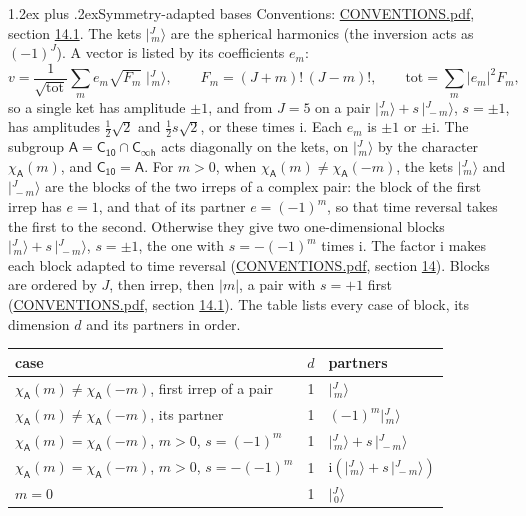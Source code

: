 \documentclass[10pt,a4paper]{article}
\makeatletter
\renewcommand\section{\@startsection{section}{1}{\z@}{-3ex plus -1ex minus -.2ex}%
  {1.2ex plus .2ex}{\normalfont\large\sffamily\bfseries\color{parttitle}}}
\numberwithin{equation}{section}
\newcommand{\grp}[1]{\mathsf{#1}}
\newcommand{\iunit}{\mathrm{i}}
\newcommand{\chiA}{\chi_{\grp{A}}}
\newcommand{\jm}[2]{\bigl\lvert{}^{#1}_{\,#2}\bigr\rangle}
\makeatother
\begin{document}
\section{Symmetry-adapted bases}\label{s:bases}
Conventions: \href{../../CONVENTIONS.pdf}{CONVENTIONS.pdf}, section \href{../../CONVENTIONS.pdf\#conv.14.1}{14.1}.
\leavevmode\label{n:index.m}\label{n:vector.ket}The kets $\jm{J}{m}$ are the spherical harmonics (the inversion acts as $(-1)^J$). \label{n:index.ketcoefficient}\label{n:vector.basis.symmetry}\label{n:index.ketweight}\label{n:index.total}A vector is listed by its coefficients $e_m$:
\begin{equation}\label{e:ket}v = \frac{1}{\sqrt{\mathrm{tot}}}\sum_m e_m\sqrt{F_m}\;\jm{J}{m},\qquad F_m = (J+m)!\,(J-m)!,\qquad \mathrm{tot} = \sum_m |e_m|^2F_m,\end{equation}
\leavevmode\label{n:index.pair.sign}so a single ket has amplitude $\pm1$, and from $J = 5$ on a pair $\jm{J}{m} + s\,\jm{J}{-m}$, $s = \pm1$, has amplitudes $\tfrac{1}{2}\sqrt{2}$ and $\tfrac{1}{2}s\sqrt{2}$, or these times $\iunit$. Each $e_m$ is $\pm1$ or $\pm\iunit$.
\leavevmode\label{n:group.A}\label{n:function.character.abelian}The subgroup $\grp{A} = \grp{C_{10}}\cap\grp{C_{\infty h}}$ acts diagonally on the kets, on $\jm{J}{m}$ by the character $\chiA(m)$, and $\grp{C_{10}} = \grp{A}$. For $m > 0$, when $\chiA(m) \ne \chiA(-m)$, the kets $\jm{J}{m}$ and $\jm{J}{-m}$ are the blocks of the two irreps of a complex pair: the block of the first irrep has $e = 1$, and that of its partner $e = (-1)^m$, so that time reversal takes the first to the second. Otherwise they give two one-dimensional blocks $\jm{J}{m} + s\,\jm{J}{-m}$, $s = \pm1$, the one with $s = -(-1)^m$ times $\iunit$. The factor $\iunit$ makes each block adapted to time reversal (\href{../../CONVENTIONS.pdf}{CONVENTIONS.pdf}, section \href{../../CONVENTIONS.pdf\#conv.14}{14}). Blocks are ordered by $J$, then irrep, then $|m|$, a pair with $s = +1$ first (\href{../../CONVENTIONS.pdf}{CONVENTIONS.pdf}, section \href{../../CONVENTIONS.pdf\#conv.14.1}{14.1}).
\leavevmode\label{n:head.case}\label{n:head.partners}The table lists every case of block, its dimension $d$ and its partners in order.
\begin{center}\begin{tabular}{@{}lrl@{}}\toprule
case & $d$ & partners\\\midrule
$\chiA(m) \ne \chiA(-m)$, first irrep of a pair & 1 & $\jm{J}{m}$\\
$\chiA(m) \ne \chiA(-m)$, its partner & 1 & $(-1)^m\jm{J}{m}$\\
$\chiA(m) = \chiA(-m)$, $m > 0$, $s = (-1)^m$ & 1 & $\jm{J}{m} + s\,\jm{J}{-m}$\\
$\chiA(m) = \chiA(-m)$, $m > 0$, $s = -(-1)^m$ & 1 & $\iunit(\jm{J}{m} + s\,\jm{J}{-m})$\\
$m = 0$ & 1 & $\jm{J}{0}$\\
\bottomrule\end{tabular}\end{center}
\end{document}
